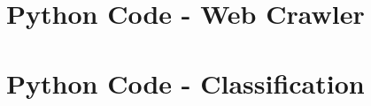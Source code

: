 \documentclass{article}
\begin{document}
\begin{appendices}
\begin{itemize}
		
	
\end{itemize}

\pagebreak
\section{Python Code - Web Crawler}


\pagebreak
\section{Python Code - Classification}




\end{appendices}
\end{document}
